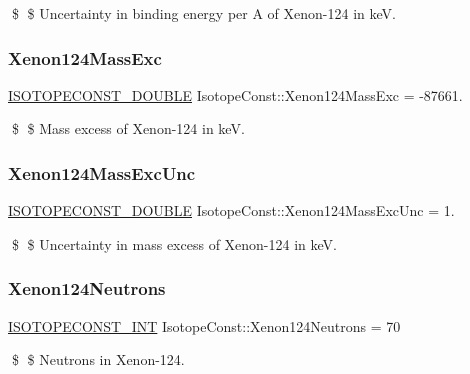 \$ \$ Uncertainty in binding energy per A of Xenon-\/124 in keV. \mbox{\label{group___isotope_const-_xenon-_xe124_gadf00e2a389346b64beef9b15f395bdcb}} 
\subsubsection{\texorpdfstring{Xenon124\+Mass\+Exc}{Xenon124MassExc}}
{\footnotesize\ttfamily \mbox{\hyperlink{group___isotope_const-_macros_ga8f45a7272ce02c0b4c65c44636ed719a}{I\+S\+O\+T\+O\+P\+E\+C\+O\+N\+S\+T\+\_\+\+D\+O\+U\+B\+LE}} Isotope\+Const\+::\+Xenon124\+Mass\+Exc = -\/87661.}

\$ \$ Mass excess of Xenon-\/124 in keV. \mbox{\label{group___isotope_const-_xenon-_xe124_ga05e3107a4168bb0f6c19146bb173d35a}} 
\subsubsection{\texorpdfstring{Xenon124\+Mass\+Exc\+Unc}{Xenon124MassExcUnc}}
{\footnotesize\ttfamily \mbox{\hyperlink{group___isotope_const-_macros_ga8f45a7272ce02c0b4c65c44636ed719a}{I\+S\+O\+T\+O\+P\+E\+C\+O\+N\+S\+T\+\_\+\+D\+O\+U\+B\+LE}} Isotope\+Const\+::\+Xenon124\+Mass\+Exc\+Unc = 1.}

\$ \$ Uncertainty in mass excess of Xenon-\/124 in keV. \mbox{\label{group___isotope_const-_xenon-_xe124_gad919d0699883366fc281cda225201f76}} 
\subsubsection{\texorpdfstring{Xenon124\+Neutrons}{Xenon124Neutrons}}
{\footnotesize\ttfamily \mbox{\hyperlink{group___isotope_const-_macros_ga5f18360b3e99483a35c32d789e62621c}{I\+S\+O\+T\+O\+P\+E\+C\+O\+N\+S\+T\+\_\+\+I\+NT}} Isotope\+Const\+::\+Xenon124\+Neutrons = 70}

\$ \$ Neutrons in Xenon-\/124. \mbox{\label{group___isotope_const-_xenon-_xe124_gaae1d6b37c7b91a01d35e4b854f6ba24e}} 
